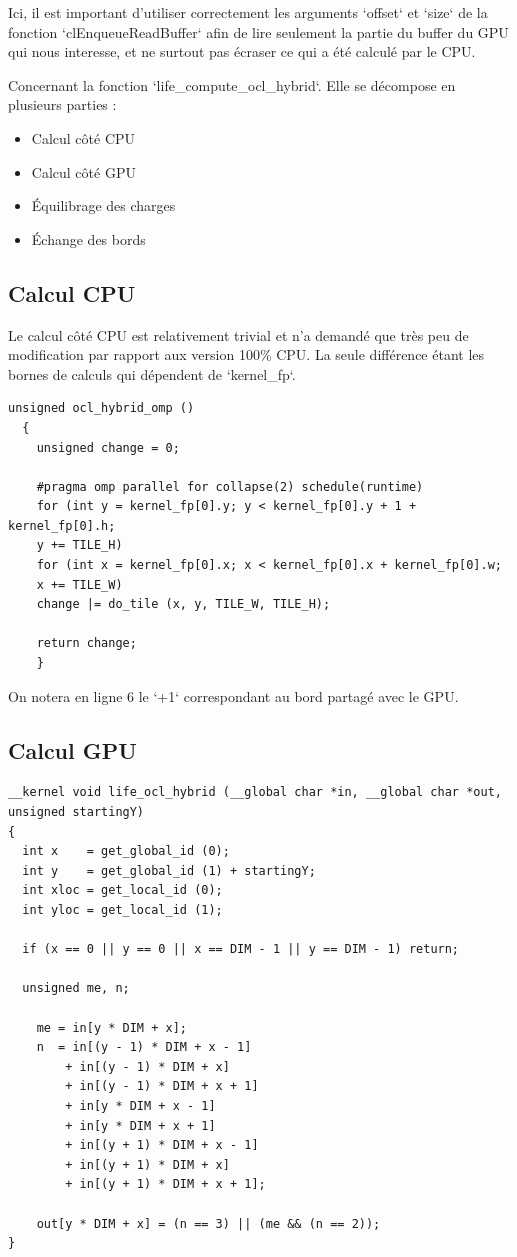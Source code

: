 \documentclass[a4paper,12pt]{article}
\begin{document}
Ici, il est important d'utiliser correctement les arguments `offset` et `size` de la fonction `clEnqueueReadBuffer` afin de lire seulement la partie du buffer du GPU qui nous interesse, et ne surtout pas écraser ce qui a été calculé par le CPU.

Concernant la fonction `life\_compute\_ocl\_hybrid`. Elle se décompose en plusieurs parties :
\begin{itemize}
  \item Calcul côté CPU
  \item Calcul côté GPU
  \item Équilibrage des charges
  \item Échange des bords
\end{itemize}

\newpage
\subsection{Calcul CPU}
Le calcul côté CPU est relativement trivial et n'a demandé que très peu de modification par rapport aux version 100\% CPU.
La seule différence étant les bornes de calculs qui dépendent de `kernel\_fp`.
\begin{lstlisting}[style=cstyle, caption=Calcul CPU]
  unsigned ocl_hybrid_omp ()
  {
    unsigned change = 0;

    #pragma omp parallel for collapse(2) schedule(runtime)
    for (int y = kernel_fp[0].y; y < kernel_fp[0].y + 1 + kernel_fp[0].h;
    y += TILE_H)
    for (int x = kernel_fp[0].x; x < kernel_fp[0].x + kernel_fp[0].w;
    x += TILE_W)
    change |= do_tile (x, y, TILE_W, TILE_H);

    return change;
    }
  \end{lstlisting}
  On notera en ligne 6 le `+1` correspondant au bord partagé avec le GPU.

\subsection{Calcul GPU}

\begin{lstlisting}[style=cstyle, caption=Kernel GPU]
__kernel void life_ocl_hybrid (__global char *in, __global char *out, unsigned startingY)
{
  int x    = get_global_id (0);
  int y    = get_global_id (1) + startingY;
  int xloc = get_local_id (0);
  int yloc = get_local_id (1);

  if (x == 0 || y == 0 || x == DIM - 1 || y == DIM - 1) return;

  unsigned me, n;

    me = in[y * DIM + x];
    n  = in[(y - 1) * DIM + x - 1]
        + in[(y - 1) * DIM + x]
        + in[(y - 1) * DIM + x + 1]
        + in[y * DIM + x - 1]
        + in[y * DIM + x + 1]
        + in[(y + 1) * DIM + x - 1]
        + in[(y + 1) * DIM + x]
        + in[(y + 1) * DIM + x + 1];

    out[y * DIM + x] = (n == 3) || (me && (n == 2));
}
\end{lstlisting}
\end{document}
